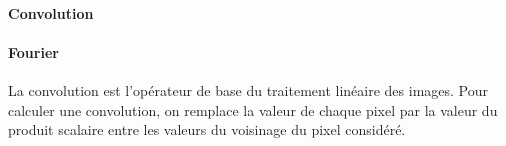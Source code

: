 	\paragraph{Convolution}

	\label{Convolution}


	\paragraph{Fourier}
	\label{Fourier}


	La convolution est l'opérateur de base du traitement linéaire des images. Pour calculer une convolution, on remplace la valeur de chaque pixel par la valeur du produit scalaire entre les valeurs du voisinage du pixel considéré.
	

